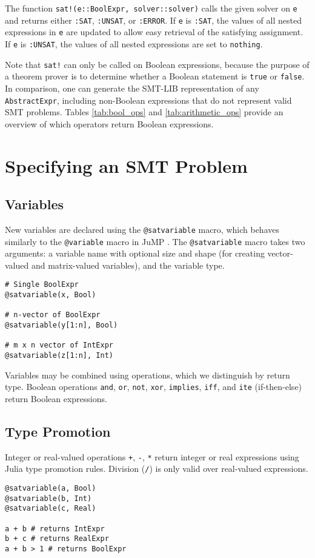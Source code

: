 \documentclass[conference]{IEEEtran}
\begin{document}
The function \verb|sat!(e::BoolExpr, solver::solver)| calls the given solver on \verb|e| and returns either \verb|:SAT|, \verb|:UNSAT|, or \verb|:ERROR|. If \verb|e| is \verb|:SAT|, the values of all nested expressions in \verb|e| are updated to allow easy retrieval of the satisfying assignment. If \verb|e| is \verb|:UNSAT|, the values of all nested expressions are set to \verb|nothing|.

Note that \verb|sat!| can only be called on Boolean expressions, because the purpose of a theorem prover is to determine whether a Boolean statement is \verb|true| or \verb|false|. In comparison, one can generate the SMT-LIB representation of any \verb|AbstractExpr|, including non-Boolean expressions that do not represent valid SMT problems. Tables \ref{tab:bool_ops} and \ref{tab:arithmetic_ops} provide an overview of which operators return Boolean expressions.

\section{Specifying an SMT Problem}
\subsection{Variables}
New variables are declared using the \verb|@satvariable| macro, which behaves similarly to the \verb|@variable| macro in JuMP \cite{Lubin2023}.
The \verb|@satvariable| macro takes two arguments: a variable name with optional size and shape (for creating vector-valued and matrix-valued variables), and the variable type.

\begin{verbatim}
# Single BoolExpr
@satvariable(x, Bool)

# n-vector of BoolExpr
@satvariable(y[1:n], Bool)

# m x n vector of IntExpr
@satvariable(z[1:n], Int)
\end{verbatim}
  
Variables may be combined using operations, which we distinguish by return type.
Boolean operations \verb|and|, \verb|or|, \verb|not|, \verb|xor|, \verb|implies|, \verb|iff|, and \verb|ite| (if-then-else) return Boolean expressions.


\subsection{Type Promotion}
Integer or real-valued operations \verb|+|, \verb|-|, \verb|*| return integer or real expressions using Julia type promotion rules. Division (\verb|/|) is only valid over real-valued expressions.
\begin{verbatim}
@satvariable(a, Bool)
@satvariable(b, Int)
@satvariable(c, Real)

a + b # returns IntExpr
b + c # returns RealExpr
a + b > 1 # returns BoolExpr
\end{verbatim}
\end{document}

